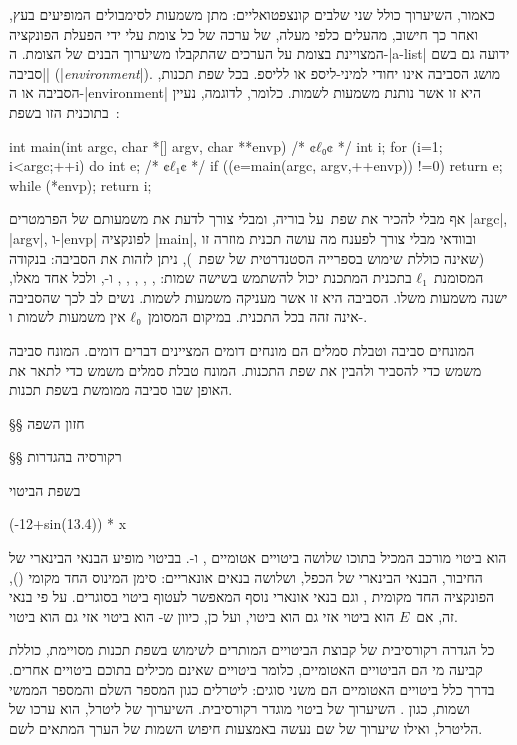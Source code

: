  כאמור, השיערוך כולל שני שלבים קונצפטואליים: מתן משמעות לסימבולים המופיעים בעץ,
 ואחר כך חישוב, מהעלים כלפי מעלה, של ערכה של כל צומת עלי ידי הפעלת הפונקציה
 המצויינת בצומת על הערכים שהתקבלו משיערוך הבנים של הצומת. 
ה-\E|a-list| ידועה גם בשם \ע|סביבה| (\E|\emph{environment}|). מושג הסביבה אינו
יחודי למיני-ליספ או לליספ. בכל שפת תכנות, הסביבה או ה-\E|environment| היא זו
אשר נותנת משמעות לשמות. כלומר, לדוגמה, נעיין בתוכנית הזו בשפת~\CPL:
\begin{CPP}
int main(int argc, char *[] argv, char **envp) {
  /* ¢$ℓ₀$¢ */ int i;
  for (i=1; i<argc;++i) {
    do {
      int e;
      /* ¢$ℓ₁$¢ */ if ((e=main(argc, argv,++envp)) !=0)
        return e;
    } while (*envp);
  }
  return i;
}
\end{CPP}
אף מבלי להכיר את שפת~\CPL על בוריה, ומבלי צורך לדעת את משמעותם של הפרמטרים
\E|argc|, \E|argv|, ו-\E|envp| לפונקציה \E|main|, ובוודאי מבלי צורך לפענח מה
עושה תכנית מוזרה זו (שאינה כוללת שימוש בספרייה הסטנדרטית של שפת~\CPL), ניתן
לזהות את הסביבה: בנקודה המסומנת~$ℓ₁$ בתכנית המתכנת יכול להשתמש בשישה שמות:
, , , , , ו-, ולכל
אחד מאלו, ישנה משמעות משלו. הסביבה היא זו אשר מעניקה משמעות לשמות.
נשים לב לכך שהסביבה אינה זהה בכל התכנית. במיקום המסומן~$ℓ₀$ אין משמעות
לשמות  ו-.

המונחים סביבה וטבלת סמלים הם מונחים דומים המציינים דברים דומים. המונח סביבה
משמש כדי להסביר ולהבין את שפת התכנות. המונח טבלת סמלים משמש כדי לתאר את האופן שבו
סביבה ממומשת בשפת תכנות.

§§ חזון השפה

§§ רקורסיה בהגדרות 

בשפת  הביטוי
\begin{PASCAL}
(-12+sin(13.4)) * x
\end{PASCAL}
הוא ביטוי מורכב המכיל בתוכו שלושה ביטויים אטומיים , 
ו-. בביטוי מופיע הבנאי הבינארי של החיבור, הבנאי הבינארי של הכפל,
ושלושה בנאים אונאריים: סימן המינוס החד מקומי (), הפונקציה החד מקומית
, וגם בנאי אונארי נוסף המאפשר לעטוף ביטוי בסוגרים. על פי בנאי
זה, אם~$E$ הוא ביטוי אזי גם  הוא ביטוי, ועל כן, כיוון
ש- הוא ביטוי אזי גם  הוא ביטוי.

כל הגדרה רקורסיבית של קבוצת הביטויים המותרים לשימוש בשפת תכנות מסויימת, כוללת
קביעה מי הם הביטויים האטומיים, כלומר ביטויים שאינם מכילים בתוכם ביטויים אחרים.
בדרך כלל ביטויים האטומיים הם משני סוגים: ליטרלים כגון המספר השלם  והמספר
הממשי  ושמות, כגון . השיערוך של ביטוי מוגדר רקורסיבית. השיערוך
של ליטרל, הוא ערכו של הליטרל, ואילו שיערוך של שם נעשה באמצעות חיפוש השמות של
הערך המתאים לשם.

